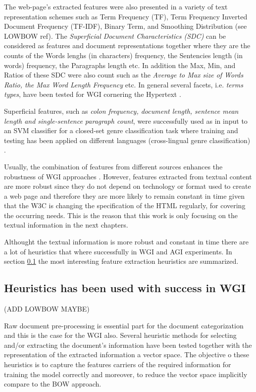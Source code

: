 The web-page's extracted features were also presented in a variety of  text  representation schemes such as Term Frequency (TF), Term Frequency  Inverted Document Frequency (TF-IDF), Binary Term, and Smoothing Distribution (see LOWBOW ref). The \textit{Superficial Document Characteristics (SDC)} can be considered as features and document representations together where they are the counts of the Words lenghs (in characters) frequency, the Sentencies length (in words) frequency, the Paragraphs length etc. In addition the Max, Min, and Ratios of these SDC were also count such as the \textit{Average to Max size of Words Ratio, the Max Word Length Frequency} etc. In general several facets, i.e. \textit{terms types}, have been tested for WGI cornering the Hypertext \parencite{feldman2009classifying,santini2005linguistic}.

 Superficial features, such as \textit{colon frequency, document length, sentence mean length and single-sentence paragraph count}, were successfully used as in input to an SVM classifier for a closed-set genre classification task where training and testing has been applied on different languages (cross-lingual genre classification) \parencite{nguyen2019cross}.

Usually, the combination of features from different sources enhances the robustness of WGI approaches \parencite{levering2008using,kanaris2009learning}. However, features extracted from textual content are more robust since they do not  depend on technology or format used to create a web page and therefore they are more likely to remain constant in time given that the W3C is changing the specification of the HTML regularly, for covering the occurring needs. This is the reason that this work is only focusing on the textual information in the next chapters.

Althought the textual information is more robust and constant in time there are a lot of heuristics that where successfully in WGI and AGI experiments. In section \ref{chap:relevant_work:sec:features:subsec:heuristics} the most interesting feature extraction heuristics are summarized.

\subsection{Heuristics has been used with success in WGI}\label{chap:relevant_work:sec:features:subsec:heuristics}

(ADD LOWBOW MAYBE)

Raw document pre-processing is essential part for the document categorization and this is the case for the WGI also. Several heuristic methods for selecting and/or extracting the document's information have been tested together with the representation of the extracted information a vector space. The objective o these heuristics is to capture the features carriers of the required information for training the model correctly and moreover, to reduce the vector space implicitly compare to the BOW approach.   

